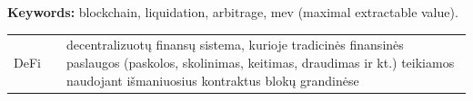 \documentclass[]{VUMIFTemplateClass}
\newcommand{\EE}{\mathbb{E}\,} %
\begin{document}
\textbf{Keywords:} blockchain, liquidation, arbitrage, mev (maximal extractable value).


\begin{tabular}{rcp{}}
    {DeFi} & {} & {decentralizuotų finansų sistema, kurioje tradicinės finansinės paslaugos (paskolos, skolinimas, keitimas, draudimas ir kt.) teikiamos naudojant išmaniuosius kontraktus blokų grandinėse}
\end{tabular}


\end{document}
